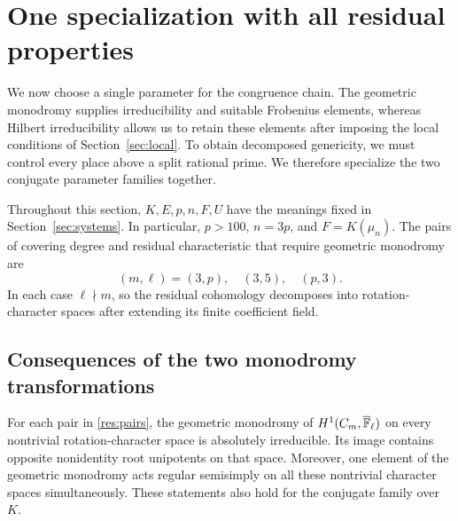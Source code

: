 \section{One specialization with all residual properties}\label{sec:residual}

We now choose a single parameter for the congruence chain.  The geometric
monodromy supplies irreducibility and suitable Frobenius elements, whereas
Hilbert irreducibility allows us to retain these elements after imposing
the local conditions of Section~\ref{sec:local}.  To obtain decomposed
genericity, we must control every place above a split rational prime.
We therefore specialize the two conjugate parameter families together.

Throughout this section, $K,E,p,n,F,U$ have the meanings fixed in
Section~\ref{sec:systems}.  In particular, $p>100$, $n=3p$, and
$F=K(\mu_n)$.  The pairs of covering degree and residual characteristic
that require geometric monodromy are
\begin{equation}\label{res:pairs}
 (m,\ell)=(3,p),\quad(3,5),\quad(p,3).
\end{equation}
In each case $\ell\nmid m$, so the residual cohomology decomposes into
rotation-character spaces after extending its finite coefficient field.

\subsection{Consequences of the two monodromy transformations}

\begin{lemma}\label{res:geometric}
For each pair in \eqref{res:pairs}, the geometric monodromy of
$H^1(C_m,\overline{\mathbb F}_\ell)$ on every nontrivial rotation-character
space is absolutely irreducible.  Its image contains opposite
nonidentity root unipotents on that space.  Moreover, one element
of the geometric monodromy acts regular semisimply on all these
nontrivial character spaces simultaneously.
These statements also hold for the conjugate family over $K$.
\end{lemma}


